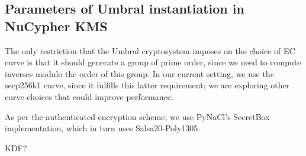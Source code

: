 \documentclass[12pt]{article}
\begin{document}
\subsection{Parameters of Umbral instantiation in NuCypher KMS}
The only restriction that the Umbral cryptosystem imposes on the choice of EC curve is that it should generate a group of prime order, since we need to compute inverses modulo the order of this group. In our current setting, we use the secp256k1 curve, since it fulfills this latter requirement; we are exploring other curve choices that could improve performance. 

As per the authenticated encryption scheme, we use PyNaCl's SecretBox implementation, which in turn uses Salsa20-Poly1305.

KDF?


\end{document}

